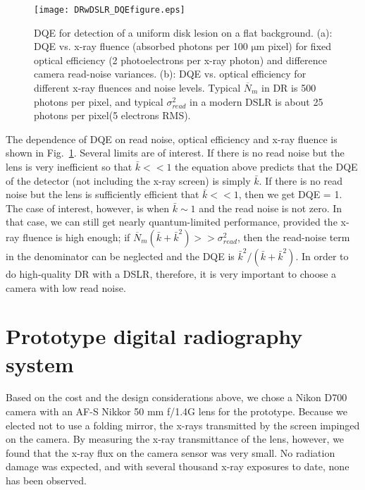 \begin{figure}[h]
\centering
\texttt{[image: DRwDSLR\_DQEfigure.eps]}
\caption{DQE for detection of a uniform disk lesion on a flat background. (a): DQE vs. x-ray fluence (absorbed photons per 100 $\mathrm{\mu m}$ pixel) for fixed optical efficiency (2 photoelectrons per x-ray photon) and difference camera read-noise variances. (b): DQE vs. optical efficiency for different x-ray fluences and noise levels. Typical $\overline{N}_m$ in DR is 500 photons per pixel, and typical $\sigma_{read}^2$ in a modern DSLR is about 25 photons per pixel(5 electrons RMS).}
\label{fig:DQE}
\end{figure}

The dependence of DQE on read noise, optical efficiency and x-ray fluence is shown in Fig.~\ref{fig:DQE}. Several limits are of interest. If there is no read noise but the lens is very inefficient so that $\bar{k} << 1$ the equation above predicts that the DQE of the detector (not including the x-ray screen) is simply $\bar{k}$.  If there is no read noise but the lens is sufficiently efficient that $\bar{k} << 1$, then we get DQE = 1. The case of interest, however, is when $\bar{k} \sim 1$ and the read noise is not zero. In that case, we can still get nearly quantum-limited performance, provided the x-ray fluence is high enough; if $\overline{N}_m(\bar{k}+\bar{k}^2) >> \sigma_{read}^2$, then the read-noise term in the denominator can be neglected and the DQE is $\bar{k}^2/(\bar{k}+\bar{k}^2)$. In order to do high-quality DR with a DSLR, therefore, it is very important to choose a camera with low read noise.

\section{Prototype digital radiography system}
Based on the cost and the design considerations above, we chose a Nikon D700 camera with an AF-S Nikkor 50 mm f/1.4G lens for the prototype.  Because we elected not to use a folding mirror, the x-rays transmitted by the screen impinged on the camera. By measuring the x-ray transmittance of the lens, however, we found that the x-ray flux on the camera sensor was very small. No radiation damage was expected, and with several thousand x-ray exposures to date, none has been observed.

